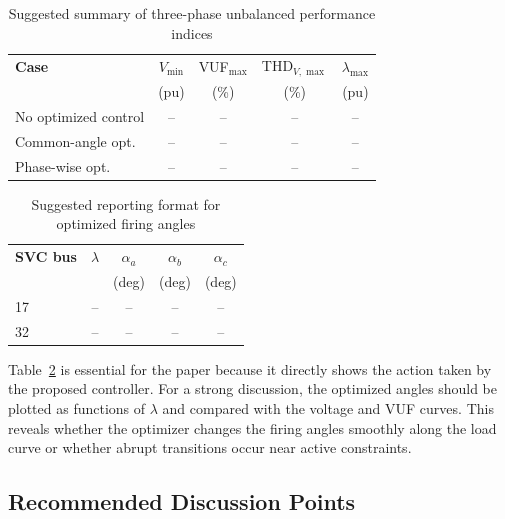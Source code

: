 \begin{table}[!t]
\centering
\caption{Suggested summary of three-phase unbalanced performance indices}
\label{tab:unbalanced_performance_suggested}
\footnotesize
\renewcommand{\arraystretch}{1.2}
\setlength{\tabcolsep}{2.5pt}
\begin{tabular}{@{}lcccc@{}}
\toprule
\textbf{Case} & $V_{\min}$ & VUF$_{\max}$ & THD$_{V,\max}$ & $\lambda_{\max}$ \\
 & (pu) & (\%) & (\%) & (pu) \\
\midrule
No optimized control & -- & -- & -- & -- \\
Common-angle opt. & -- & -- & -- & -- \\
Phase-wise opt. & -- & -- & -- & -- \\
\bottomrule
\end{tabular}
\end{table}

\begin{table}[!t]
\centering
\caption{Suggested reporting format for optimized firing angles}
\label{tab:optimized_angles_suggested}
\footnotesize
\renewcommand{\arraystretch}{1.2}
\begin{tabular}{@{}lcccc@{}}
\toprule
\textbf{SVC bus} & $\lambda$ & $\alpha_a$ & $\alpha_b$ & $\alpha_c$ \\
 &  & (deg) & (deg) & (deg) \\
\midrule
17 & -- & -- & -- & -- \\
32 & -- & -- & -- & -- \\
\bottomrule
\end{tabular}
\end{table}

\noindent Table~\ref{tab:optimized_angles_suggested} is essential for the
paper because it directly shows the action taken by the proposed controller.
For a strong discussion, the optimized angles should be plotted as functions
of $\lambda$ and compared with the voltage and VUF curves. This reveals
whether the optimizer changes the firing angles smoothly along the load curve
or whether abrupt transitions occur near active constraints.


\subsection{Recommended Discussion Points}
\label{subsec:recommended_discussion_points}


